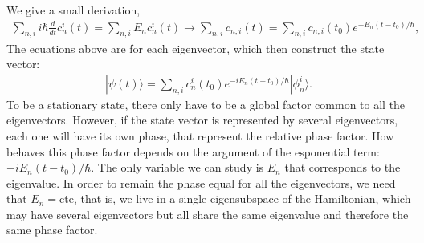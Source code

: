 \documentclass[letterpaper,11pt,twoside]{article}
\newcommand{\ket}[1]{|#1\rangle}
\begin{document}
\begin{enumerate}[itemsep=0pt,topsep=0pt,label=\alph*)]
  We give a small derivation,
  \begin{align*}
    \sum_{n,i}i\hbar\frac{d}{dt}c^i_n(t)=\sum_{n,i}E_nc^i_n(t)\longrightarrow\sum_{n,i}c_{n,i}(t)=\sum_{n,i}c_{n,i}(t_0)e^{-E_n(t-t_0)/\hbar},
  \end{align*} 
  The ecuations above are for each eigenvector, which then construct the state vector:
  \begin{align*}
    \ket{\psi(t)}=\sum_{n,i}c_n^i(t_0)e^{-iE_n(t-t_0)/\hbar}\ket{\phi_n^i}.
  \end{align*} 
  To be a stationary state, there only have to be a global factor common to all the eigenvectors. However, if the state vector is represented by several eigenvectors,
  each one will have its own phase, that represent the relative phase factor. How behaves this phase factor depends on the argument of the esponential term:
  $-iE_n(t-t_0)/\hbar$. The only variable we can study is $E_n$ that corresponds to the eigenvalue. In order to remain the phase equal for all the eigenvectors, 
  we need that $E_n=\text{cte}$, that is, we live in a single eigensubspace of the Hamiltonian, which may have several eigenvectors but all share the same eigenvalue and therefore 
  the same phase factor. 
\end{enumerate}
\end{document}
